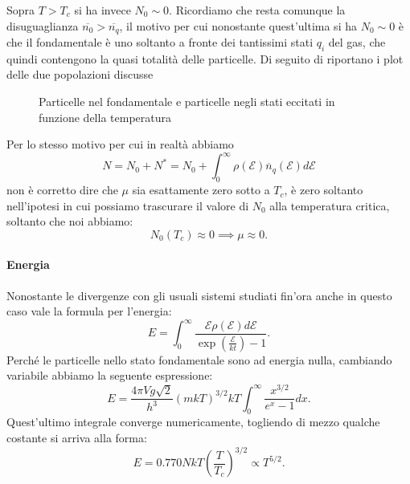 Sopra $T>T_{c}$ si ha invece $N_0 \sim 0$. Ricordiamo che resta comunque la disuguaglianza $\overline{n_0}>\overline{n_{q}}$, il motivo per cui nonostante quest'ultima si ha $N_0 \sim 0$ è che il fondamentale è uno soltanto a fronte dei tantissimi stati $q_{i}$ del gas, che quindi contengono la quasi totalità delle particelle. Di seguito di riportano i plot delle due popolazioni discusse
\begin{figure}[H]
    \centering
    \caption{Particelle nel fondamentale e particelle negli stati eccitati in funzione della temperatura}
    \label{fig:particelle-nel-fondamentale-e-particelle-negli-stati-eccitati-in-funzione-della-temperatura}
\end{figure}
\noindent
Per lo stesso motivo per cui in realtà abbiamo 
\[
	N = N_0 + N^{*}= N_0 + 
	\int_{0}^{\infty} 
	\rho ( \mathcal{E} )\overline{n}_{q}( \mathcal{E} ) 
	d\mathcal{E} 
\]
non è corretto dire che $\mu $ sia esattamente zero sotto a $T_{c}$, è zero soltanto nell'ipotesi in cui possiamo trascurare il valore di $N_0$ alla temperatura critica, soltanto che noi abbiamo:
\[
	N_0( T_{c}) \approx 0 \implies \mu \approx 0
.\] 
\paragraph{Energia}
Nonostante le divergenze con gli usuali sistemi studiati fin'ora anche in questo caso vale la formula per l'energia:
\[
	E = \int_{0}^{\infty} 
	\frac{\mathcal{E} \rho ( \mathcal{E} ) d\mathcal{E} }
	{\exp\left( \frac{\mathcal{E} }{kt} \right) -1} 
.\] 
Perché le particelle nello stato fondamentale sono ad energia nulla, cambiando variabile abbiamo la seguente espressione:
\[
	E = \frac{4\pi V g \sqrt{2} }
	{h^3}\left( m k T \right) ^{3 /2} kT 
	\int_{0}^{\infty} \frac{x^{3 /2}}{e^{x}-1}dx  
.\] 
Quest'ultimo integrale converge numericamente, togliendo di mezzo qualche costante si arriva alla forma:
\[
	E = 0.770 NkT \left( \frac{T}{T_{c}} \right) ^{3 /2} \propto T^{5 /2}
.\] 
